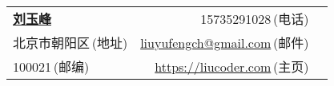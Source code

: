 
\newcommand{\myheader}{
	\begin{tabular*}{\textwidth}{l@{\extracolsep{\fill}}rr}
  		\textbf{\href{http://herechen.github.io}{\LARGE 刘玉峰}} & 15735291028$\,${\color{labelgrey}(电话)} & \\
  		北京市朝阳区$\,${\color{labelgrey}(地址)} & \href{mailto:liuyufengch@gmail.com}{liuyufengch@gmail.com}$\,${\color{labelgrey}(邮件)} & \\
  		100021$\,${\color{labelgrey}(邮编)} & \href{https://iucoder.com}{https://liucoder.com}$\,${\color{labelgrey}(主页)} & \\
 	 \end{tabular*}\\\vspace{0.1in}
}

\myheader

